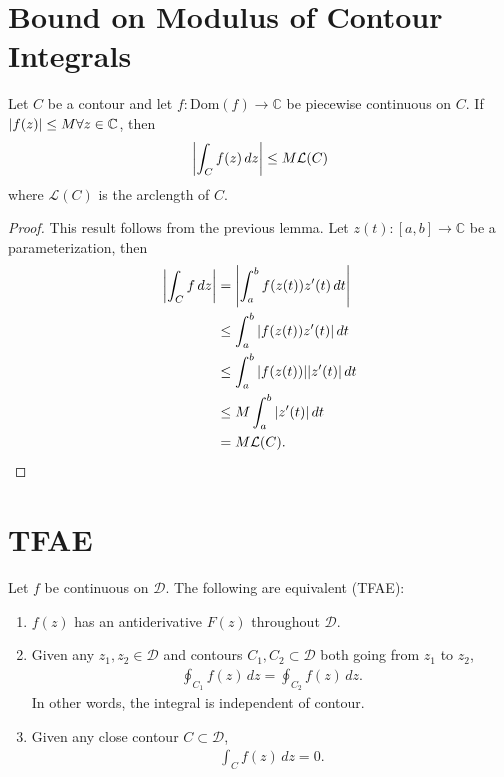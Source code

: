 \documentclass{article}
\theoremstyle{definition}
\newcommand{\C}{\mathbb{C}}
\newcommand{\lag}{\mathcal{L}}
\newcommand{\nn}{\nonumber}
\begin{document}
\section{Bound on Modulus of Contour Integrals}

Let $C$ be a contour and let $f: \text{Dom}(f) \to \C$ be piecewise continuous on $C$. If $\abs{f(z)} \leq M \forall z \in \C$, then 
\begin{align}
\abs{\int_C f(z)\,dz} \leq M\lag(C)
\end{align} 
where $\lag(C)$ is the arclength of $C$.


\begin{proof}
	This result follows from the previous lemma. Let $z(t): [a,b] \to \C$ be a parameterization, then
	\begin{align}
	\abs{\int_C f\,dz} &= \abs{\int^b_a f(z(t)) z'(t)\,dt }\nn\\
	&\leq \int^b_a \abs{f(z(t)) z'(t)}\,dt\nn\\
	&\leq \int^b_a \abs{f(z(t))}\abs{ z'(t)}\,dt\nn\\
	&\leq M \int^b_a \abs{z'(t)}\,dt\nn\\
	&= M \lag(C).
	\end{align}
\end{proof}




\section{TFAE}

Let $f$ be continuous on $\mathcal{D}$. The following are equivalent (TFAE):

\begin{enumerate}
	\item $f(z)$ has an antiderivative $F(z)$ throughout $\mathcal{D}$.
	
	\item Given any $z_1, z_2 \in \mathcal{D}$ and contours $C_1, C_2 \subset \mathcal{D}$ both going from $z_1$ to $z_2$,
	\begin{align}
	\oint_{C_1}f(z)\,dz = \oint_{C_2}f(z)\,dz.
	\end{align}
	In other words, the integral is independent of contour. 
	
	\item Given any close contour $C \subset \mathcal{D}$, 
	\begin{align}
	\int_{C} f(z)\,dz = 0.
	\end{align}
\end{enumerate}
\end{document}
